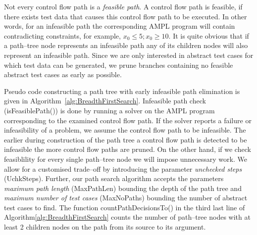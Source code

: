 \documentclass[runningheads,a4paper]{llncs}%
\newcommand{\UMLType}[1]{\textsf{\textit{#1}}} %
\begin{document}
Not every control flow path is a \emph{feasible path}. A control flow path is
feasible, if there exists test data that causes this control flow path to be
executed. In other words, for an infeasible path the corresponding AMPL program
will contain contradicting constraints, for example, $x_0\leq5; x_0\geq10$. It
is quite obvious that if a path--tree node represents an infeasible path any of
its children nodes will also represent an infeasible path. Since we are only
interested in abstract test cases for which test data can be generated, we prune
branches containing no feasible abstract test cases as early as possible.

Pseudo code constructing a path tree with early infeasible path elimination is
given in Algorithm~\ref{alg:BreadthFirstSearch}. Infeasible path check
(isFeasiblePath()) is done by running a solver on the AMPL program corresponding
to the examined control flow path. If the solver reports a failure or
infeasibility of a problem, we assume the control flow path to be infeasible.
The earlier during construction of the path tree a control flow path is detected
to be infeasible the more control flow paths are pruned. On the other hand, if
we check feasiblility for every single path--tree node we will impose
unnecessary work. We allow for a customised trade--off by introducing the
parameter \emph{unchecked steps} (UchkSteps). Further, our path search algorithm
accepts the parameters \emph{maximum path length} (MaxPathLen) bounding the
depth of the path tree and \emph{maximum number of test cases} (MaxNoPaths)
bounding the number of abstract test cases to find. The function
countPathDecisionsTo() in the third last line of
Algorithm\ref{alg:BreadthFirstSearch} counts the number of path--tree nodes with
at least 2 children nodes on the path from its source to its argument. %
\end{document}
